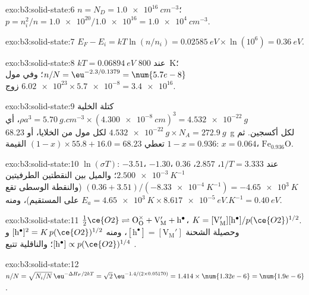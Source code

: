 \begin{solution}{exo:b3:solid-state:6}
$n = N_D = \qty{1.0e16}{cm^{-3}}$؛ $p = n_i^2/n = \num{1.0e20}/\num{1.0e16} = \qty{1.0e4}{cm^{-3}}$.
\end{solution}

\begin{solution}{exo:b3:solid-state:7}
$E_F - E_i = kT\ln(n/n_i) = \qty{0.02585}{eV} \times \ln(10^6) = \qty{0.36}{eV}$.
\end{solution}

\begin{solution}{exo:b3:solid-state:8}
$kT = \qty{0.06894}{eV}$ عند \qty{800}{K}؛ $n/N = \eu^{-2.3/0.1379} = \num{5.7e-8}$؛ وفي مول $\num{6.02e23} \times \num{5.7e-8} = \num{3.4e16}$
زوج.
\end{solution}

\begin{solution}{exo:b3:solid-state:9}
كتلة الخلية $\rho a^3 = \qty{5.70}{g.cm^{-3}} \times (\qty{4.300e-8}{cm})^3 = \qty{4.532e-22}{g}$، أي
$\qty{4.532e-22}{g} \times N_A = \qty{272.9}{g}$ لكل مول من الخلايا، أو \qty{68.23}{g} لكل أكسجين. ثم
تعطي $(1 - x) \times 55.8 + 16.0 = 68.23$ القيمة $1 - x = 0.936$: $x = 0.064$، $\mathrm{Fe_{0.936}O}$.
\end{solution}

\begin{solution}{exo:b3:solid-state:10}
$\ln(\sigma T)$: $-3.51$، $-1.30$، $0.36$ عند $1/T = 3.333$، $2.857$، $\qty{2.500e-3}{K^{-1}}$؛ والميل بين النقطتين الطرفيتين
$(0.36 + 3.51)/(-\qty{8.33e-4}{K^{-1}}) = -\qty{4.65e3}{K}$ (والنقطة الوسطى تقع على المستقيم)، ومنه
$E_a = \qty{4.65e3}{K} \times \qty{8.617e-5}{eV.K^{-1}} = \qty{0.40}{eV}$.
\end{solution}

\begin{solution}{exo:b3:solid-state:11}
$\tfrac12\ce{O2} \rightleftharpoons \mathrm{O_O^{\times} + V_M' + h^{\bullet}}$، $K = [\mathrm{V_M'}][\mathrm h^\bullet]/p(\ce{O2})^{1/2}$. وحصيلة الشحنة $[\mathrm h^\bullet] = [\mathrm{V_M'}]$، ومنه
$[\mathrm h^\bullet]^2 = K\,p(\ce{O2})^{1/2}$ و$[\mathrm h^\bullet] \propto p(\ce{O2})^{1/4}$؛ والناقلية تتبع .
\end{solution}

\begin{solution}{exo:b3:solid-state:12}
$n/N = \sqrt{N_i/N}\,\eu^{-\Delta H_F/2kT} = \sqrt 2\,\eu^{-1.4/(2 \times 0.05170)} = 1.414 \times \num{1.32e-6} = \num{1.9e-6}$.
\end{solution}

